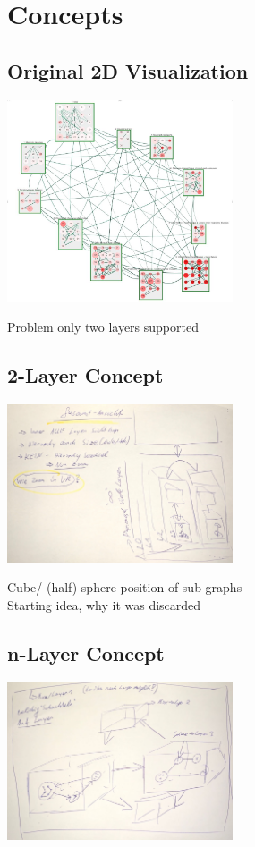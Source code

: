 \section{Concepts}
\subsection{Original 2D Visualization}
\includegraphics[width=0.5\textwidth]{chapters/graphics/2dVisOfDemoData.jpg}

Problem only two layers supported

\subsection{2-Layer Concept}
\includegraphics[width=0.5\textwidth]{chapters/graphics/concept2.jpg}

Cube/ (half) sphere position of sub-graphs \\
Starting idea, why it was discarded

\subsection{n-Layer Concept}
\includegraphics[width=0.5\textwidth]{chapters/graphics/concept1.jpg}

